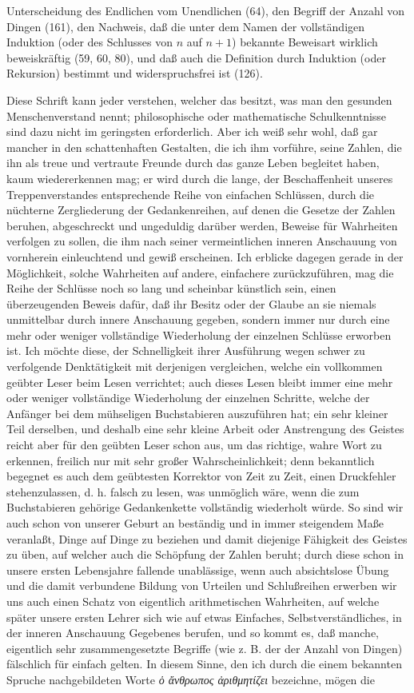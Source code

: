 \documentclass[11pt]{article}
\begin{document}
Unterscheidung des Endlichen vom Unendlichen (64), den Begriff der Anzahl von Dingen (161), den Nachweis, daß die unter dem Namen der vollständigen Induktion (oder des Schlusses von $n$ auf $n+1$) bekannte Beweisart wirklich beweiskräftig (59, 60, 80), und daß auch die Definition durch Induktion (oder Rekursion) bestimmt und widerspruchsfrei ist (126).

Diese Schrift kann jeder verstehen, welcher das besitzt, was man den gesunden Menschenverstand nennt; philosophische oder mathematische Schulkenntnisse sind dazu nicht im geringsten erforderlich. Aber ich weiß sehr wohl, daß gar mancher in den schattenhaften Gestalten, die ich ihm vorführe, seine Zahlen, die ihn als treue und vertraute Freunde durch das ganze Leben begleitet haben, kaum wiedererkennen mag; er wird durch die lange, der Beschaffenheit unseres Treppenverstandes entsprechende Reihe von einfachen Schlüssen, durch die nüchterne Zergliederung der Gedankenreihen, auf denen die Gesetze der Zahlen beruhen, abgeschreckt und ungeduldig darüber werden, Beweise für Wahrheiten verfolgen zu sollen, die ihm nach seiner vermeintlichen inneren Anschauung von vornherein einleuchtend und gewiß erscheinen. Ich erblicke dagegen gerade in der Möglichkeit, solche Wahrheiten auf andere, einfachere zurückzuführen, mag die Reihe der Schlüsse noch so lang und scheinbar künstlich sein, einen überzeugenden Beweis dafür, daß ihr Besitz oder der Glaube an sie niemals unmittelbar durch innere Anschauung gegeben, sondern immer nur durch eine mehr oder weniger vollständige Wiederholung der einzelnen Schlüsse erworben ist. Ich möchte diese, der Schnelligkeit ihrer Ausführung wegen schwer zu verfolgende Denktätigkeit mit derjenigen vergleichen, welche ein vollkommen geübter Leser beim Lesen verrichtet; auch dieses Lesen bleibt immer eine mehr oder weniger vollständige Wiederholung der einzelnen Schritte, welche der Anfänger bei dem mühseligen Buchstabieren auszuführen hat; ein sehr kleiner Teil derselben, und deshalb eine sehr kleine Arbeit oder Anstrengung des Geistes reicht aber für den geübten Leser schon aus, um das richtige, wahre Wort zu erkennen, freilich nur mit sehr großer Wahrscheinlichkeit; denn bekanntlich begegnet es auch dem geübtesten Korrektor von Zeit zu Zeit, einen Druckfehler stehenzulassen, d. h. falsch zu lesen, was unmöglich wäre, wenn die zum Buchstabieren gehörige Gedankenkette vollständig wiederholt würde. So sind wir auch schon von unserer Geburt an beständig und in immer steigendem Maße veranlaßt, Dinge auf Dinge zu beziehen und damit diejenige Fähigkeit des Geistes zu üben, auf welcher auch die Schöpfung der Zahlen beruht; durch diese schon in unsere ersten Lebensjahre fallende unablässige, wenn auch absichtslose Übung und die damit verbundene Bildung von Urteilen und Schlußreihen erwerben wir uns auch einen Schatz von eigentlich arithmetischen Wahrheiten, auf welche später unsere ersten Lehrer sich wie auf etwas Einfaches, Selbstverständliches, in der inneren Anschauung Gegebenes berufen, und so kommt es, daß manche, eigentlich sehr zusammengesetzte Begriffe (wie z. B. der der Anzahl von Dingen) fälschlich für einfach gelten. In diesem Sinne, den ich durch die einem bekannten Spruche nachgebildeten Worte \emph{ὁ ἄνθρωπος ἀριθμητίζει} bezeichne, mögen die 
\end{document}
